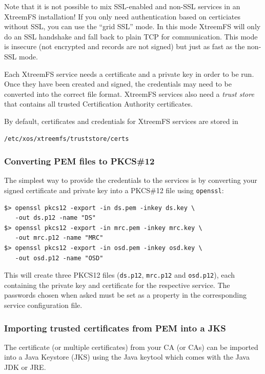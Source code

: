 \documentclass[a4paper,10pt]{book}
\begin{document}
Note that it is not possible to mix SSL-enabled and non-SSL services in an XtreemFS installation! If you only need authentication based on certiciates without SSL, you can use the ``grid SSL'' mode. In this mode XtreemFS will only do an SSL handshake and fall back to plain TCP for communication. This mode is insecure (not encrypted and records are not signed) but just as fast as the non-SSL mode.

Each XtreemFS service needs a certificate and a private key in order to be run. Once they have been created and signed, the credentials may need to be converted into the correct file format. XtreemFS services also need a \textit{trust store} that contains all trusted Certification Authority certificates.

By default, certificates and credentials for XtreemFS services are stored in
\begin{verbatim}
/etc/xos/xtreemfs/truststore/certs
\end{verbatim}


\subsubsection{Converting PEM files to PKCS\#12}
The simplest way to provide the credentials to the services is by converting your signed certificate and private key into a PKCS\#12 file using \texttt{openssl}:


\begin{verbatim}
$> openssl pkcs12 -export -in ds.pem -inkey ds.key \
   -out ds.p12 -name "DS"
$> openssl pkcs12 -export -in mrc.pem -inkey mrc.key \
   -out mrc.p12 -name "MRC"
$> openssl pkcs12 -export -in osd.pem -inkey osd.key \
   -out osd.p12 -name "OSD"
\end{verbatim}


This will create three PKCS12 files (\texttt{ds.p12}, \texttt{mrc.p12} and \texttt{osd.p12}), each containing the private key and certificate for the respective service. The passwords chosen when asked must be set as a property in the corresponding service configuration file.


\subsubsection{Importing trusted certificates from PEM into a JKS}

The certificate (or multiple certificates) from your CA (or CAs) can be imported into a Java Keystore (JKS)  using the Java keytool which comes with the Java JDK or JRE.
\end{document}
